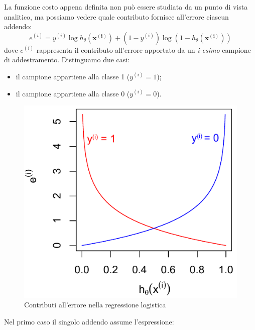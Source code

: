La funzione costo appena definita non può essere studiata da un punto di vista analitico, ma possiamo vedere quale contributo fornisce all'errore ciascun addendo:
 \begin{equation*}
  e^{(i)} = {y^{(i)}}\log{h_\theta(\mathbf{x^{(i)}})} + (1-y^{(i)})
 \log{(1 - h_\theta(\mathbf{x^{(i)}}))}
\end{equation*}
dove $e^{(i)}$ rappresenta il contributo all'errore apportato da un \emph{i-esimo} campione di addestramento.
 Distinguamo due casi:
\begin{itemize}
\item il campione appartiene alla classe 1  ($y^{(i)}=1$);
\item il campione appartiene alla classe 0 ($y^{(i)}=0$).
\end{itemize}

\begin{figure}[]
\centering
  \includegraphics[width=0.5\columnwidth]{images/errori_logistica}
  \caption{Contributi all'errore nella regressione logistica}
  \label{fig:errori_logistica}
\end{figure}

Nel primo caso il singolo addendo assume l'espressione:

